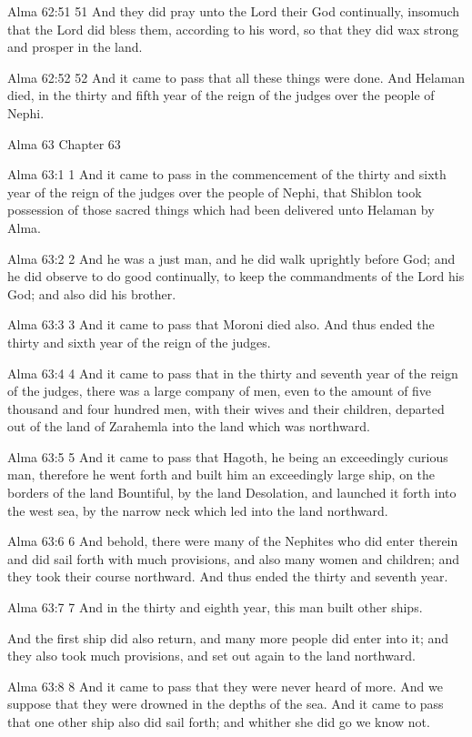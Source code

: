 Alma 62:51
 51 And they did pray unto the Lord their God continually,
insomuch that the Lord did bless them, according to his word, so
that they did wax strong and prosper in the land.

Alma 62:52
 52 And it came to pass that all these things were done. And
Helaman died, in the thirty and fifth year of the reign of the
judges over the people of Nephi.

Alma 63
Chapter 63

Alma 63:1
 1 And it came to pass in the commencement of the thirty and
sixth year of the reign of the judges over the people of Nephi,
that Shiblon took possession of those sacred things which had
been delivered unto Helaman by Alma.

Alma 63:2
 2 And he was a just man, and he did walk uprightly before God;
and he did observe to do good continually, to keep the
commandments of the Lord his God; and also did his brother.

Alma 63:3
 3 And it came to pass that Moroni died also. And thus ended the
thirty and sixth year of the reign of the judges.

Alma 63:4
 4 And it came to pass that in the thirty and seventh year of the
reign of the judges, there was a large company of men, even to
the amount of five thousand and four hundred men, with their
wives and their children, departed out of the land of Zarahemla
into the land which was northward.

Alma 63:5
 5 And it came to pass that Hagoth, he being an exceedingly
curious man, therefore he went forth and built him an exceedingly
large ship, on the borders of the land Bountiful, by the land
Desolation, and launched it forth into the west sea, by the
narrow neck which led into the land northward.

Alma 63:6
 6 And behold, there were many of the Nephites who did enter
therein and did sail forth with much provisions, and also many
women and children; and they took their course northward. And
thus ended the thirty and seventh year.

Alma 63:7
 7 And in the thirty and eighth year, this man built other ships.

And the first ship did also return, and many more people did
enter into it; and they also took much provisions, and set out
again to the land northward.

Alma 63:8
 8 And it came to pass that they were never heard of more. And
we suppose that they were drowned in the depths of the sea. And
it came to pass that one other ship also did sail forth; and
whither she did go we know not.


